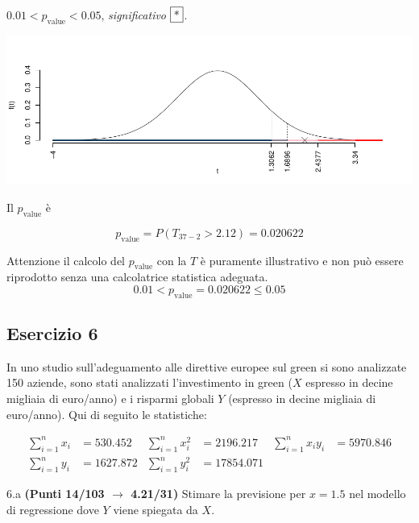 \documentclass[
  11pt,
]{book}
\theoremstyle{mytheoremstyle}
\theoremstyle{mydefstyle}
\newenvironment{sol}
  {
  \begin{tcolorbox}[enhanced,breakable,arc=0.1mm,boxrule=1pt,colback=white,colframe=iblue,
  title=\bf \fontfamily{lmss}\selectfont \hspace{.5 cm} Soluzione,drop fuzzy shadow]

}{
\end{tcolorbox}
  }
\begin{document}
\begin{sol}
\(0.01<p_\text{value}<0.05\), \emph{significativo} \(\fbox{*}\).

\begin{center}\includegraphics{Esami_passati_con_soluzioni_files/figure-latex/2023-22,-1} \end{center}

Il \(p_{\text{value}}\) è

\[ p_{\text{value}} = P(T_{37-2}>2.12)=0.020622 \]

Attenzione il calcolo del \(p_\text{value}\) con la \(T\) è puramente illustrativo e non può essere riprodotto senza una calcolatrice statistica adeguata.\[
 0.01 < p_\text{value}= 0.020622 \leq 0.05 
\]

\end{sol}

\subsection{Esercizio 6}\label{esercizio-6-21}

In uno studio sull'adeguamento alle direttive europee sul green si sono analizzate 150 aziende, sono stati analizzati l'investimento in green (\(X\) espresso in decine migliaia di euro/anno) e i risparmi globali \(Y\) (espresso in decine migliaia di euro/anno). Qui di seguito le statistiche:

\begin{align*}
  \sum_{i=1}^n x_i &= 530.452 &\sum_{i=1}^n x_i^2 &= 2196.217 &\sum_{i=1}^n x_i y_i &= 5970.846\\
  \sum_{i=1}^n y_i &= 1627.872 & \sum_{i=1}^n y_i^2 &= 17854.071 &
\end{align*}

6.a \textbf{(Punti 14/103 \(\rightarrow\) 4.21/31)} Stimare la previsione per \(x=1.5\) nel modello di regressione dove \(Y\) viene spiegata da \(X\).
\end{document}
